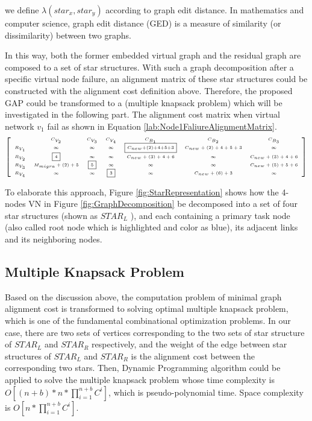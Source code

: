 we define $\lambda(star_x,star_y)$ according to graph edit distance\cite{sanfeliu1983distance}. In mathematics and computer science, graph edit distance (GED) is a measure of similarity (or dissimilarity) between two graphs.

In this way, both the former embedded virtual graph and the residual graph are composed to  a set of star structures. With such a graph decomposition after a specific virtual node failure, an alignment matrix of these star structures could be constructed with the alignment cost definition above. Therefore, the proposed GAP could be transformed to a (multiple knapsack problem) which will be investigated in the following part. The alignment cost matrix when virtual network $v_1$ fail as shown in Equation \ref{lab:Node1FaliureAlignmentMatrix}.
\begin{equation}
\tiny{
\left[ {\begin{array}{*{20}{c}}
&C_{V_{2}}&C_{V_3}&C_{V_4}&C_{B_{1}}&C_{B_{2}}&C_{B_{3}}\\
{R_{V_1}}&\infty&\infty&\infty&\fbox{$C_{new}$+(2)+4+5+3}&C_{new}+(2)+4+5+3&\infty\\
R_{V_2}&\fbox{4}&\infty&\infty&C_{new}+(3)+4+6&\infty&C_{new}+(3)+4+6\\
R_{V_3}&M_{migra}+(2)+5&\fbox{5}&\infty&\infty&\infty&C_{new}+(5)+5+6\\
R_{V_4}&\infty&\infty&\fbox{3}&\infty&C_{new}+(6)+3&\infty\\
\end{array}} \right]
}
\label{lab:Node1FaliureAlignmentMatrix}
\end{equation}

To elaborate this approach, Figure \ref{fig:StarRepresentation} shows how the 4-nodes VN in Figure \ref{fig:GraphDecomposition} be decomposed into a set of four star structures (shown as $STAR_L$ ), and each containing a primary task node (also called root node which is highlighted and color as blue), its adjacent links and its neighboring nodes.

\subsection{Multiple Knapsack Problem}
Based on the discussion above, the computation problem of minimal graph alignment cost is transformed to solving optimal multiple knapsack problem, which is one of the fundamental combinational optimization problems. In our case, there are two sets of vertices corresponding to the two sets of star structure of $STAR_L$ and $STAR_R$ respectively, and the weight of the edge between star structures of $STAR_L$ and $STAR_R$ is the alignment cost between the corresponding two stars. Then, Dynamic Programming algorithm could be applied to solve the multiple knapsack problem whose time complexity is $O[(n+b)*n*\prod_{i=1}^{n+b}C^i]$, which is pseudo-polynomial time. Space complexity is $O[n*\prod_{i=1}^{n+b}C^i]$.


